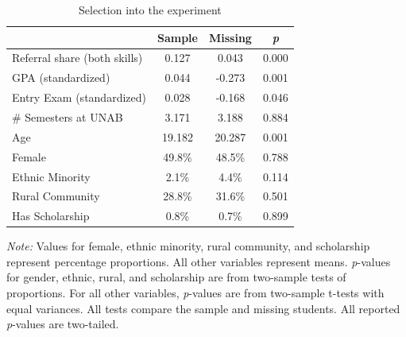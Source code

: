 \documentclass[11pt,a4paper,oneside]{article}
\begin{document}
\begin{table}[H]
\centering
\begin{threeparttable}
\caption{Selection into the experiment}\label{tab:missing}
\begin{tabular*}{0.8\textwidth}{@{\extracolsep{\fill}}lcc c@{}}
\toprule
 & \multicolumn{1}{c}{\textbf{Sample}} & \multicolumn{1}{c}{\textbf{Missing}} & \multicolumn{1}{c}{\textit{\textbf{p}}} \\ \midrule
Referral share (both skills)  & 0.127 & 0.043 & \multicolumn{1}{c}{0.000} \\
GPA (standardized) & 0.044 & -0.273 & \multicolumn{1}{c}{0.001} \\
Entry Exam (standardized) & 0.028 & -0.168 & \multicolumn{1}{c}{0.046} \\
\# Semesters at UNAB & 3.171 & 3.188 & \multicolumn{1}{c}{0.884} \\
Age & 19.182 & 20.287 & \multicolumn{1}{c}{0.001} \\
Female & 49.8\% & 48.5\% & \multicolumn{1}{c}{0.788} \\
Ethnic Minority & 2.1\% & 4.4\% & \multicolumn{1}{c}{0.114} \\
Rural Community & 28.8\% & 31.6\% & \multicolumn{1}{c}{0.501} \\
Has Scholarship & 0.8\% & 0.7\% & \multicolumn{1}{c}{0.899} \\
\bottomrule
\end{tabular*}
\begin{tablenotes}[flushleft]
\footnotesize
\item[] \textit{Note:} Values for female, ethnic minority, rural community, and scholarship represent percentage proportions. All other variables represent means. \textit{p}-values for gender, ethnic, rural, and scholarship are from two-sample tests of proportions. For all other variables, \textit{p}-values are from two-sample t-tests with equal variances. All tests compare the sample and missing students. All reported \textit{p}-values are two-tailed.
\end{tablenotes}
\label{tab:test-results}
\end{threeparttable}
\end{table}
\end{document}

